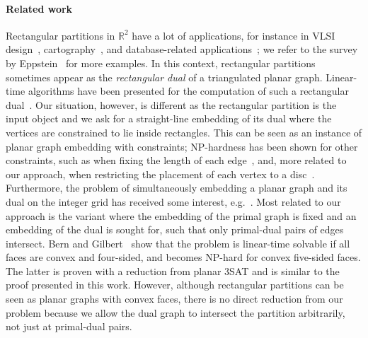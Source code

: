 \documentclass[12pt]{article}
\newcommand{\R}{\mathbb{R}}
\begin{document}
\paragraph{Related work}
Rectangular partitions in $\R^2$ have a lot of applications, for instance
 in VLSI design~\cite{lly-compact}, cartography~\cite{reisz-statistical}, and database-related applications~\cite{mps-rectangular}; 
we refer to the survey by Eppstein~\cite{eppstein-regular}
for more examples. In this context, rectangular partitions sometimes appear as the \emph{rectangular dual} of a triangulated planar graph. 
Linear-time algorithms have been presented for the computation 
of such a rectangular dual~\cite{he-finding}.
Our situation, however, is different as the rectangular partition is the input object and we ask for a straight-line embedding of its dual
where the vertices are constrained to lie inside rectangles. 
This can be seen as an instance of planar graph embedding with constraints;
NP-hardness has been shown for other constraints, such as when fixing the length of each edge~\cite{ew-fixed}, and, more related to our approach, when restricting
the placement of each vertex to a disc~\cite{godau-difficulty}. Furthermore, the problem of simultaneously embedding a planar graph and its dual on the integer grid
has received some interest, e.g.~\cite{ek-simultaneous}. Most related to our approach is the variant where the embedding of the primal graph is fixed and an embedding
of the dual is sought for, such that only primal-dual pairs of edges intersect. Bern and Gilbert~\cite{bg-drawing} show that the problem is linear-time solvable
if all faces are convex and four-sided, and becomes NP-hard for convex five-sided faces. The latter is proven with a reduction from planar 3SAT and is
similar to the proof presented in this work. However, although rectangular partitions can be seen as planar graphs with convex faces, there is no direct
reduction from our problem because we allow the dual graph to intersect the partition arbitrarily, not just at primal-dual pairs.
\end{document}
